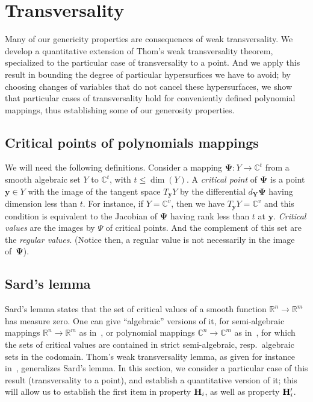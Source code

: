 \documentclass[a4paper]{article}
\def\C{\mathbb{C}}
\def\R{\mathbb{R}}
\begin{document}
\section{Transversality}
Many of our genericity properties are consequences of weak transversality. We develop a quantitative extension of Thom’s weak transversality theorem, specialized to the particular case of transversality to a point. And we apply this result in bounding the degree of particular hypersurfices we have to avoid; by choosing changes of variables that do not cancel these hypersurfaces, we show that particular cases of transversality hold for conveniently defined polynomial mappings, thus establishing some of our generosity properties.  



\subsection{Critical points of polynomials mappings}
We will need the following definitions. Consider a mapping $\bm \Psi : Y \rightarrow \C^t$ 
from a smooth algebraic set $Y$ to $\C^t$, with $t\le \dim(Y)$. A {\em
  critical point} of $\bm \Psi$ is a point $\bm y \in Y$ with the
image of the tangent space $T_{\bm y} Y$ by the differential $d_{\bm
  Y} \bm \Psi$ having dimension less than $t$. For instance, if
$Y=\C^v$, then we have $T_{\bm y} Y=\C^v$ and this condition is equivalent
to the Jacobian of $\bm \Psi$ having rank less than $t$ at $\bm y$.
{\em Critical values} are the images by $\Psi$ of critical points. And the
complement of this set are the {\em regular values}. (Notice then, a regular
value is not necessarily in the image of~$\bm\Psi$).


\subsection{Sard's lemma}
Sard's lemma states that the set of critical values of a smooth
function $\R^n \to \R^m$ has measure zero. One can give ``algebraic''
versions of it, for semi-algebraic mappings $\R^n \to \R^m$ as
in~\cite[Chapter~9]{bochnak1998real}, or polynomial mappings $\C^n \to
\C^m$ as in~\cite[Chapter~3]{Mumford76}, for which the sets of
critical values are contained in strict semi-algebraic,
resp.\ algebraic sets in the codomain. Thom's weak transversality
lemma, as given for instance in~\cite{demazure2000bifurcations},
generalizes Sard's lemma. In this section, we consider a particular
case of this result (transversality to a point), and establish a
quantitative version of it; this will allow us to establish the first
item in property ${\bf H}_i$, as well as property ${\bf H}'_i$. 
\end{document}
